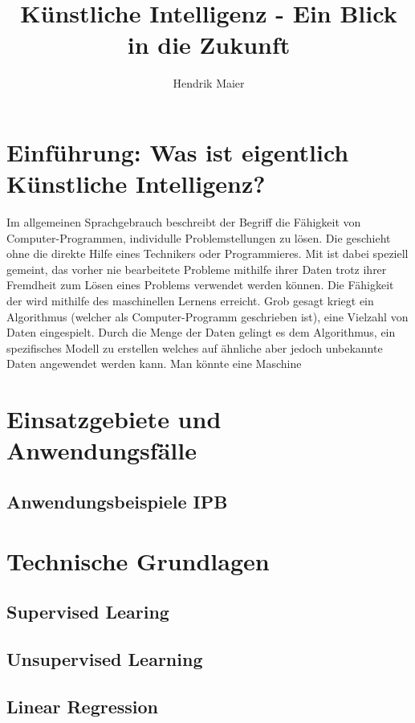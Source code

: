 \documentclass[12pt]{report}
\title{Künstliche Intelligenz - Ein Blick in die Zukunft}
\author{Hendrik Maier}
\date{}
\begin{document}
    \maketitle

    \tableofcontents
    \newpage

    \section{Einführung: Was ist eigentlich Künstliche Intelligenz?}
    Im allgemeinen Sprachgebrauch beschreibt der Begriff  die Fähigkeit von Computer-Programmen,
    individulle Problemstellungen zu lösen. Die geschieht ohne die direkte Hilfe eines Technikers oder Programmieres.
    Mit  ist dabei speziell gemeint, das vorher nie bearbeitete Probleme mithilfe ihrer Daten
    trotz ihrer Fremdheit zum Lösen eines Problems verwendet werden können. Die Fähigkeit der 
    wird mithilfe des maschinellen Lernens erreicht. Grob gesagt kriegt ein Algorithmus (welcher als Computer-Programm geschrieben ist),
    eine Vielzahl von Daten eingespielt. Durch die Menge der Daten gelingt es dem Algorithmus, ein spezifisches
    Modell zu erstellen welches auf ähnliche aber jedoch unbekannte Daten angewendet werden kann.
    Man könnte eine Maschine


    \section{Einsatzgebiete und Anwendungsfälle}

    \subsection{Anwendungsbeispiele IPB}
    \section{Technische Grundlagen}
    \subsection{Supervised Learing}
    \subsection{Unsupervised Learning}
    \subsection{Linear Regression}
\end{document}
